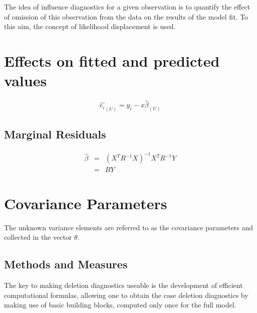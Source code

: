 \documentclass[12pt, a4paper]{article}
\begin{document}
			The idea of influence diagnostics for a given observation is to quantify the effect of omission of this observation 
			from the data on the results of the model fit. To this aim, the concept of likelihood displacement is used. 
			
			
			
			
			
			\section{Effects on fitted and predicted values}
			\begin{equation}
			\hat{e_{i}}_{(U)} = y_{i} - x\hat{\beta}_{(U)}
			\end{equation}
			

			
			\subsection{Marginal Residuals}
			\begin{eqnarray}
			\hat{\beta} &=& (X^{T}R^{-1}X)^{-1}X^{T}R^{-1}Y \nonumber \\
			&=& BY \nonumber
			\end{eqnarray}
			
			
			\section{Covariance Parameters} %
			The unknown variance elements are referred to as the covariance parameters and collected in the vector $\theta$.
			
			\subsection{Methods and Measures}
			The key to making deletion diagnostics useable is the development of efficient computational formulas, allowing one to obtain the  case deletion diagnostics by making use of basic building blocks, computed only once for the full model.
			
\end{document}
